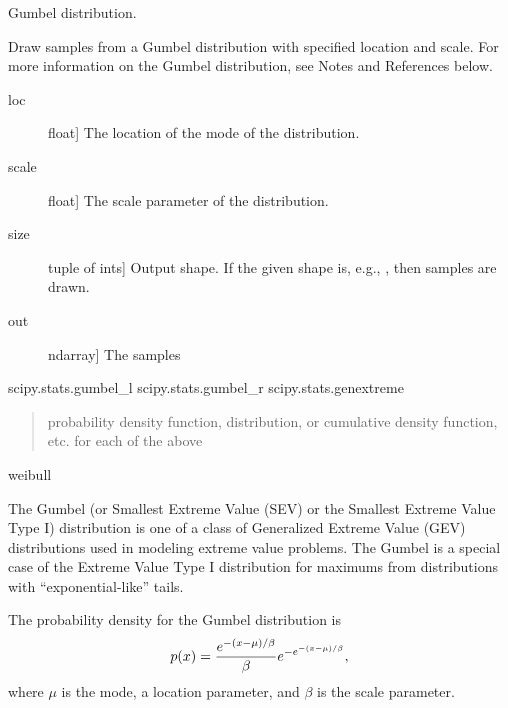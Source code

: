 \documentclass[letterpaper,10pt,english]{sphinxmanual}
\begin{document}
\begin{fulllineitems}
\label{pygeomod:pygeomod.geomodeller_xml_obj.gumbel}
Gumbel distribution.

Draw samples from a Gumbel distribution with specified location and scale.
For more information on the Gumbel distribution, see Notes and References
below.
\begin{description}
\item[{loc}] \leavevmode{[}float{]}
The location of the mode of the distribution.

\item[{scale}] \leavevmode{[}float{]}
The scale parameter of the distribution.

\item[{size}] \leavevmode{[}tuple of ints{]}
Output shape.  If the given shape is, e.g., , then
 samples are drawn.

\end{description}
\begin{description}
\item[{out}] \leavevmode{[}ndarray{]}
The samples

\end{description}

scipy.stats.gumbel\_l
scipy.stats.gumbel\_r
scipy.stats.genextreme
\begin{quote}

probability density function, distribution, or cumulative density
function, etc. for each of the above
\end{quote}

weibull

The Gumbel (or Smallest Extreme Value (SEV) or the Smallest Extreme Value
Type I) distribution is one of a class of Generalized Extreme Value (GEV)
distributions used in modeling extreme value problems.  The Gumbel is a
special case of the Extreme Value Type I distribution for maximums from
distributions with ``exponential-like'' tails.

The probability density for the Gumbel distribution is
\begin{gather}
\begin{split}p(x) = \frac{e^{-(x - \mu)/ \beta}}{\beta} e^{ -e^{-(x - \mu)/
\beta}},\end{split}\notag
\end{gather}
where \(\mu\) is the mode, a location parameter, and \(\beta\) is
the scale parameter.


\end{fulllineitems}
\end{document}
